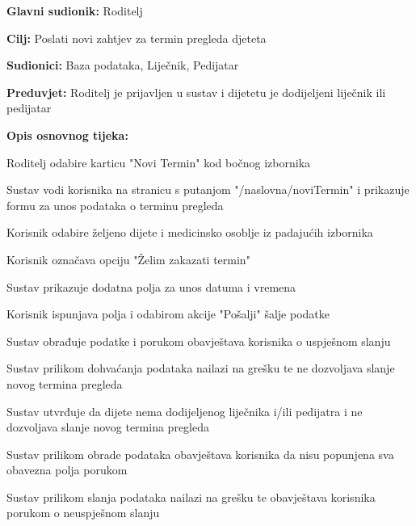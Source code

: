 				
				\noindent {}
				\begin{packed_item}
					\item \textbf{Glavni sudionik: }Roditelj
					\item  \textbf{Cilj:} Poslati novi zahtjev za termin pregleda djeteta
					\item  \textbf{Sudionici:} Baza podataka, Liječnik, Pedijatar
					\item  \textbf{Preduvjet:} Roditelj je prijavljen u sustav i dijetetu je dodijeljeni liječnik ili pedijatar
					\item  \textbf{Opis osnovnog tijeka:}
					\item[] \begin{packed_enum}
						\item Roditelj odabire karticu "Novi Termin" kod bočnog izbornika
						\item Sustav vodi korisnika na stranicu s putanjom "/naslovna/noviTermin" i prikazuje formu za unos podataka o terminu pregleda
						\item Korisnik odabire željeno dijete i medicinsko osoblje iz padajućih izbornika
						\item Korisnik označava opciju "Želim zakazati termin"
						\item Sustav prikazuje dodatna polja za unos datuma i vremena
						\item Korisnik ispunjava polja i odabirom akcije "Pošalji" šalje podatke
						\item Sustav obrađuje podatke i porukom obavještava korisnika o uspješnom slanju
						
						\item[] \begin{packed_item}
						\item[3.a] Sustav prilikom dohvaćanja podataka nailazi na grešku te ne dozvoljava slanje novog termina pregleda
						
						\item[3.b] Sustav utvrđuje da dijete nema dodijeljenog liječnika i/ili pedijatra i ne dozvoljava slanje novog termina pregleda
						
						\item[7.a] Sustav prilikom obrade podataka obavještava korisnika da nisu popunjena sva obavezna polja porukom
						
						\item[7.b] Sustav prilikom slanja podataka nailazi na grešku te obavještava korisnika porukom o neuspješnom slanju	
					\end{packed_item}
				\end{packed_enum}
						
					\end{packed_item}
					
